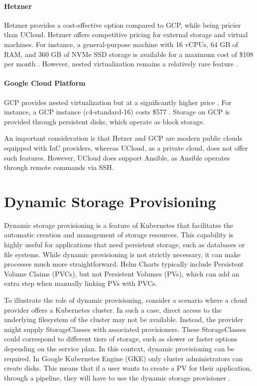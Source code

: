 \paragraph{Hetzner} Hetzner provides a cost-effective option compared to GCP, while being pricier than UCloud. Hetzner offers competitive pricing for external storage and virtual machines. For instance, a general-purpose machine with 16 vCPUs, 64 GB of RAM, and 360 GB of NVMe SSD storage is available for a maximum cost of \$108 per month \Parencite{hetznercloud}. However, nested virtualization remains a relatively rare feature \Parencite{hetzner_nested_virtualization}.

\paragraph{Google Cloud Platform} GCP provides nested virtualization but at a significantly higher price \Parencite{gcp_nested_virtualization}. For instance, a GCP instance (c4-standard-16) costs \$577 \Parencite{google2025pricing}. Storage on GCP is provided through persistent disks, which operate as block storage.

An important consideration is that Hetzer and GCP are modern public clouds equipped with IaC providers, whereas UCloud, as a private cloud, does not offer such features. However, UCloud does support Ansible, as Ansible operates through remote commands via SSH.

\section{Dynamic Storage Provisioning}
Dynamic storage provisioning is a feature of Kubernetes that facilitates the automatic creation and management of storage resources. This capability is highly useful for applications that need persistent storage, such as databases or file systems. While dynamic provisioning is not strictly necessary, it can make processes much more straightforward. Helm Charts typically include Persistent Volume Claims (PVCs), but not Persistent Volumes (PVs), which can add an extra step when manually linking PVs with PVCs.

To illustrate the role of dynamic provisioning, consider a scenario where a cloud provider offers a Kubernetes cluster. In such a case, direct access to the underlying filesystem of the cluster may not be available. Instead, the provider might supply StorageClasses with associated provisioners. These StorageClasses could correspond to different tiers of storage, such as slower or faster options depending on the service plan. In this context, dynamic provisioning can be required. In Google Kubernetes Engine (GKE) only cluster administrators can create disks. This means that if a user wants to create a PV for their application, through a pipeline, they will have to use the dynamic storage provisioner \Parencite{googlek8spv}. 

